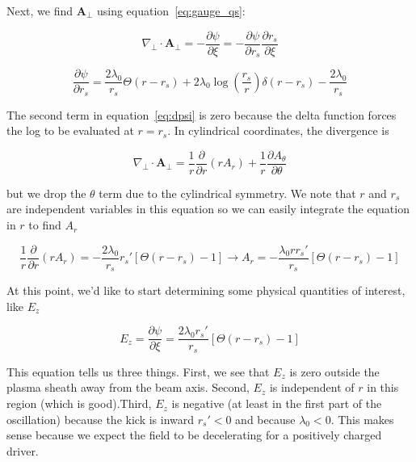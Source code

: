 \documentclass[aps,prl,preprint,groupedaddress]{revtex4-1}
\begin{document}
Next, we find $\mathbf{A}_{\perp}$ using equation~\ref{eq:gauge_qs}:

\begin{equation}\label{eq:a_perp}
\nabla_\perp \cdot \mathbf{A}_\perp = -\frac{\partial \psi}{\partial \xi} = - \frac{\partial \psi}{\partial r_s}\frac{\partial r_s}{\partial \xi}
\end{equation}

\begin{equation}\label{eq:dpsi}
\frac{\partial \psi}{\partial r_s} = \frac{2\lambda_0}{r_s}\Theta(r-r_s) + 2\lambda_0 \log\left(\frac{r_s}{r}\right)\delta(r-r_s) - \frac{2\lambda_0}{r_s} 
\end{equation}

The second term in equation~\ref{eq:dpsi} is zero because the delta function forces the log to be evaluated at $r=r_s$. In cylindrical coordinates, the divergence is

\begin{equation}\label{eq:a_perp_cyl}
\nabla_\perp \cdot \mathbf{A}_\perp = \frac{1}{r}\frac{\partial}{\partial r} (r A_r) + \frac{1}{r}\frac{\partial A_{\theta}}{\partial \theta}
\end{equation}

but we drop the $\theta$ term due to the cylindrical symmetry. We note that $r$ and $r_s$ are independent variables in this equation so we can easily integrate the equation in $r$ to find $A_r$

\begin{equation}\label{eq:a_r}
\frac{1}{r}\frac{\partial}{\partial r} (r A_r) = -\frac{2\lambda_0}{r_s}r_s'\left[\Theta(r-r_s)-1\right] \rightarrow A_r = -\frac{\lambda_0 r r_s'}{r_s}\left[\Theta(r-r_s)-1\right] 
\end{equation}

At this point, we'd like to start determining some physical quantities of interest, like $E_z$

\begin{equation}\label{eq:E_z}
E_z = \frac{\partial \psi}{\partial \xi} = \frac{2\lambda_0 r_s'}{r_s}\left[\Theta(r-r_s)-1\right] 
\end{equation}

This equation tells us three things. First, we see that $E_z$ is zero outside the plasma sheath away from the beam axis. Second, $E_z$ is independent of $r$ in this region (which is good).Third, $E_z$ is negative (at least in the first part of the oscillation) because the kick is inward $r_s' < 0$ and because $\lambda_0 < 0$. This makes sense because we expect the field to be decelerating for a positively charged driver. 
\end{document}
